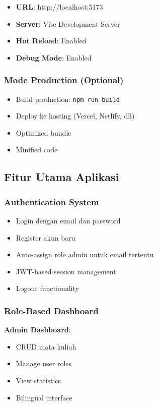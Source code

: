 \documentclass[12pt,a4paper]{article}
\begin{document}
\begin{itemize}
    \item \textbf{URL}: http://localhost:5173
    \item \textbf{Server}: Vite Development Server
    \item \textbf{Hot Reload}: Enabled
    \item \textbf{Debug Mode}: Enabled
\end{itemize}

\subsubsection{Mode Production (Optional)}

\begin{itemize}
    \item Build production: \texttt{npm run build}
    \item Deploy ke hosting (Vercel, Netlify, dll)
    \item Optimized bundle
    \item Minified code
\end{itemize}

\subsection{Fitur Utama Aplikasi}

\subsubsection{Authentication System}

\begin{itemize}
    \item Login dengan email dan password
    \item Register akun baru
    \item Auto-assign role admin untuk email tertentu
    \item JWT-based session management
    \item Logout functionality
\end{itemize}

\subsubsection{Role-Based Dashboard}

\textbf{Admin Dashboard}:
\begin{itemize}
    \item CRUD mata kuliah
    \item Manage user roles
    \item View statistics
    \item Bilingual interface
\end{itemize}
\end{document}
